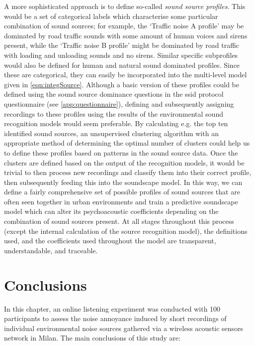 A more sophisticated approach is to define so-called \emph{sound source profiles}. This would be a set of categorical labels which characterise some particular combination of sound sources; for example, the `Traffic noise A profile' may be dominated by road traffic sounds with some amount of human voices and sirens present, while the `Traffic noise B profile' might be dominated by road traffic with loading and unloading sounds and no sirens. Similar specific subprofiles would also be defined for human and natural sound dominated profiles. Since these are categorical, they can easily be incorporated into the multi-level model given in \cref{eqn:integSource}. Although a basic version of these profiles could be defined using the sound source dominance questions in the \gls{ssid} protocol questionnaire (see \cref{app:questionnaire}), defining and subsequently assigning recordings to these profiles using the results of the environmental sound recognition models would seem preferable. By calculating e.g. the top ten identified sound sources, an unsupervised clustering algorithm with an appropriate method of determining the optimal number of clusters could help us to define these profiles based on patterns in the sound source data. Once the clusters are defined based on the output of the recognition models, it would be trivial to then process new recordings and classify them into their correct profile, then subsequently feeding this into the soundscape model. In this way, we can define a fairly comprehensive set of possible profiles of sound sources that are often seen together in urban environments and train a predictive soundscape model which can alter its psychoacoustic coefficients depending on the combination of sound sources present. At all stages throughout this process (except the internal calculation of the source recognition model), the definitions used, and the coefficients used throughout the model are transparent, understandable, and traceable. 


\section{Conclusions}

In this chapter, an online listening experiment was conducted with 100 participants to assess the noise annoyance induced by short recordings of individual environmental noise sources gathered via a wireless acoustic sensors network in Milan. The main conclusions of this study are:

